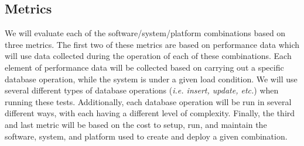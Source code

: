 \documentclass{article}[12pt]
\numberwithin{equation}{section}
\begin{document}
\begin{center}
\end{center}
\begin{flushleft}
	
	

\section{Metrics}

\begin{spacing}{1.5}
We will evaluate each of the software/system/platform combinations based on three metrics.  The first two of these metrics are based on performance data which will use data collected during the operation of each of these combinations.  Each element of performance data will be collected based on carrying out a specific database operation, while the system is under a given load condition.  We will use several different types of database operations (\emph{i.e. insert, update, etc.}) when running these tests.  Additionally, each database operation will be run in several different ways, with each having a different level of complexity.  Finally, the third and last metric will be based on the cost to setup, run, and maintain the software, system, and platform used to create and deploy a given combination.
\end{spacing}















































\end{flushleft}
\end{document}
